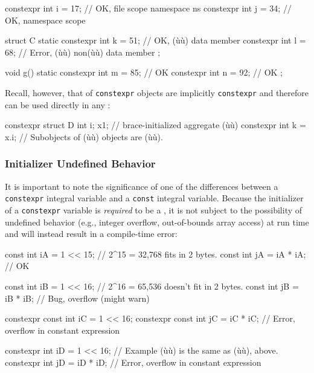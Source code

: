 \begin{enumerate}
{\begin{emcppslisting}
               constexpr int i = 17;    // OK, file scope
namespace ns { constexpr int j = 34; }  // OK, namespace scope

struct C
{
    static constexpr int k = 51;  // OK, (ù{}ù) data member
           constexpr int l = 68;  // Error, (ù{}ù) non(ù{}ù) data member
};

void g()
{
    static constexpr int m = 85;  // OK
           constexpr int n = 92;  // OK
};
\end{emcppslisting}
    
\noindent Recall, however, that  of
\lstinline!constexpr! objects are implicitly \lstinline!constexpr! and
therefore can be used directly in any :

\begin{emcppslisting}
constexpr struct D { int i; } x{1};  // brace-initialized aggregate (ù{}ù)
constexpr int k = x.i;  // Subobjects of (ù{}ù) objects are (ù{}ù).
\end{emcppslisting}
}
\end{enumerate}

\subsubsection[Initializer Undefined Behavior]{Initializer Undefined Behavior}

It is important to note the significance of one of the
differences between a \lstinline!constexpr! integral variable and a
\lstinline!const! integral variable. Because the initializer of a
\lstinline!constexpr! variable is \emph{required} to be a , it is not subject to the possibility of undefined behavior
(e.g., integer overflow, out-of-bounds array access) at run time and will
instead result in a compile-time error:

\begin{emcppslisting}
          const int iA = 1 << 15;  // 2^15 = 32,768 fits in 2 bytes.
          const int jA = iA * iA;  // OK

          const int iB = 1 << 16;  // 2^16 = 65,536 doesn't fit in 2 bytes.
          const int jB = iB * iB;  // Bug, overflow (might warn)

constexpr const int iC = 1 << 16;
constexpr const int jC = iC * iC;  // Error, overflow in constant expression

constexpr       int iD = 1 << 16;  // Example (ù{}ù) is the same as (ù{}ù), above.
constexpr       int jD = iD * iD;  // Error, overflow in constant expression
\end{emcppslisting}
    
